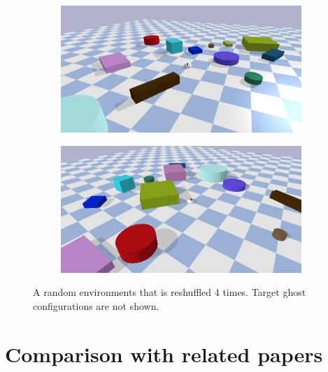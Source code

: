 \begin{figure}[H]
    \vspace{0.2cm}
    \begin{subfigure}{.49\textwidth}
    \includegraphics[width=\textwidth]{figures/tests/random3}
    \end{subfigure}
    \hfill
    \begin{subfigure}{.49\textwidth}
    \centering
    \includegraphics[width=\textwidth]{figures/tests/random4}
    \end{subfigure}
    \caption{A random environments that is reshuffled 4 times. Target ghost configurations are not shown.}
    \label{fig:random_environment_reshuffle}
\end{figure}


\section{Comparison with related papers}%
\label{sec:compare_with_related_papers}

